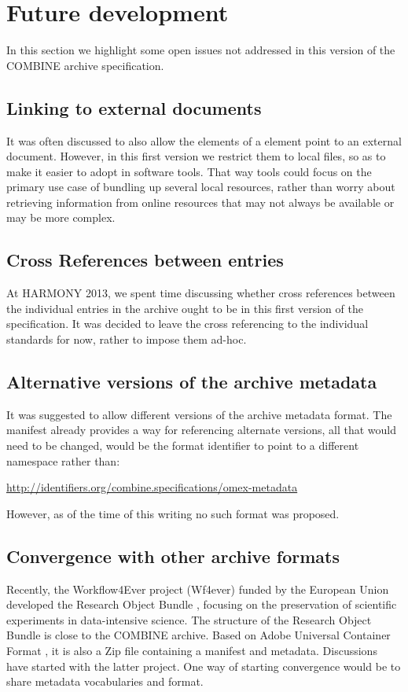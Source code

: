
\section{Future development}
\label{future}
In this section we highlight some open issues not addressed in this 
version of the COMBINE archive specification. 


\subsection{Linking to external documents}
It was often discussed to also allow the  elements of a 
\Content element point to an external document. However, in this first 
version we restrict them to local files, so as to make it easier to 
adopt in software tools. That way tools could focus on the primary use 
case of bundling up several local resources, rather than worry about 
retrieving information from online resources that may not always be 
available or may be more complex.

\subsection{Cross References between entries}
At HARMONY 2013, we spent time discussing whether cross references 
between the individual entries in the archive ought to be in this first 
version of the specification. It was decided to leave the cross 
referencing to the individual standards for now, rather to impose them 
ad-hoc. 

\subsection{Alternative versions of the archive metadata}
It was suggested to allow different versions of the archive metadata 
format. The manifest already provides a way for referencing alternate 
versions, all that would need to be changed, would be the format 
identifier to point to a different namespace rather than: 


\url{http://identifiers.org/combine.specifications/omex-metadata}

However, as of the time of this writing no such format was proposed.

\subsection{Convergence with other archive formats}
Recently, the Workflow4Ever project (Wf4ever) funded by the European Union 
developed the Research Object Bundle \citep{ro2013}, focusing on the preservation
of scientific experiments in data-intensive science. The structure of the 
Research Object Bundle is close to the COMBINE archive. Based on Adobe 
Universal Container Format \citep{ucf}, it is also a Zip file containing 
a manifest and metadata. Discussions have started with the latter project. 
One way of starting convergence would be to share metadata vocabularies and format. 



